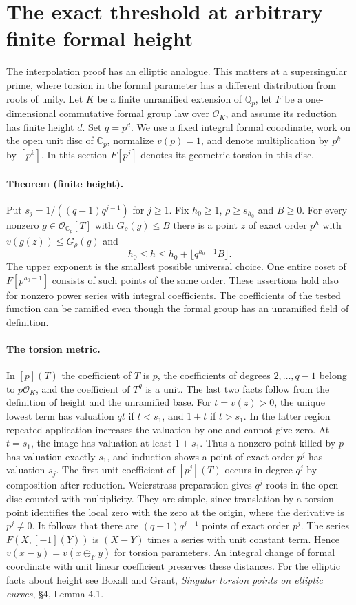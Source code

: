 \section{The exact threshold at arbitrary finite formal height}
\label{sec:height}

The interpolation proof has an elliptic analogue. This matters at a
supersingular prime, where torsion in the formal parameter has a
different distribution from roots of unity. Let $K$ be a finite
unramified extension of $\mathbb Q_p$, let $F$ be a one-dimensional
commutative formal group law over $\mathcal O_K$, and assume its
reduction has finite height $d$. Set $q=p^d$. We use a fixed integral
formal coordinate, work on the open unit disc of $\mathbb C_p$, normalize
$v(p)=1$, and denote multiplication by $p^k$ by $[p^k]$. In this
section $F[p^j]$ denotes its geometric torsion in this disc.

\paragraph{Theorem (finite height).}
Put $s_j=1/((q-1)q^{j-1})$ for $j\ge1$. Fix $h_0\ge1$,
$\rho\ge s_{h_0}$ and $B\ge0$. For every nonzero
$g\in\mathcal O_{\mathbb C_p}[T]$ with $G_\rho(g)\le B$ there is a
point $z$ of exact order $p^h$ with $v(g(z))\le G_\rho(g)$ and
\[
          h_0\le h\le h_0+\lfloor q^{h_0-1}B\rfloor.
\]
The upper exponent is the smallest possible universal choice.
One entire coset of $F[p^{h_0-1}]$ consists of such points of the same
order. These assertions hold also for nonzero power series with integral
coefficients. The coefficients of the tested function can be ramified
even though the formal group has an unramified field of definition.

\paragraph{The torsion metric.}
In $[p](T)$ the coefficient of $T$ is $p$, the coefficients of
degrees $2,\ldots,q-1$ belong to $p\mathcal O_K$, and the coefficient of
$T^q$ is a unit. The last two facts follow from the definition of height
and the unramified base. For $t=v(z)>0$, the unique lowest term has
valuation $qt$ if $t<s_1$, and $1+t$ if $t>s_1$. In the latter
region repeated application increases the valuation by one and cannot
give zero. At $t=s_1$, the image has valuation at least $1+s_1$.
Thus a nonzero point killed by $p$ has valuation exactly $s_1$, and
induction shows a point of exact order $p^j$ has valuation $s_j$.
The first unit coefficient of $[p^j](T)$ occurs in degree $q^j$ by
composition after reduction. Weierstrass preparation gives $q^j$ roots
in the open disc counted with multiplicity. They are simple, since
translation by a torsion point identifies the local zero with the
zero at the origin, where the derivative is $p^j\ne0$.
It follows that there are $(q-1)q^{j-1}$ points of exact order $p^j$.
The series $F(X,[-1](Y))$ is $(X-Y)$ times a series with unit constant
term. Hence $v(x-y)=v(x\mathbin{\ominus_F}y)$ for torsion parameters.
An integral change of formal coordinate with unit linear coefficient
preserves these distances. For the elliptic facts about height see
Boxall and Grant, \emph{Singular torsion points on elliptic curves},
\S4, Lemma 4.1.

